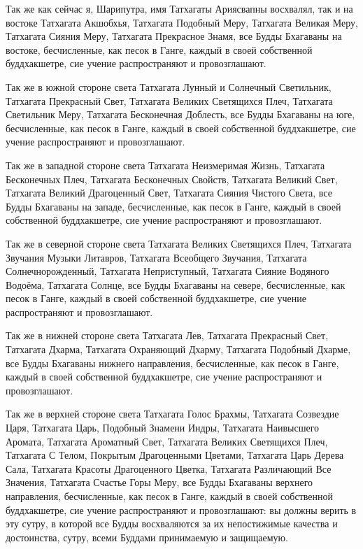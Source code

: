 \documentclass[openany, oneside]{book}
\begin{document}
Так же как сейчас я, Шарипутра, имя Татхагаты Ариясвапны восхвалял, так и на востоке Татхагата Акшобхья, Татхагата Подобный Меру, Татхагата Великая Меру, Татхагата Сияния Меру, Татхагата Прекрасное Знамя, все Будды Бхагаваны на востоке, бесчисленные, как песок в Ганге, каждый в своей собственной буддхакшетре, сие учение распространяют и провозглашают.

Так же в южной стороне света Татхагата Лунный и Солнечный Светильник, Татхагата Прекрасный Свет, Татхагата Великих Светящихся Плеч, Татхагата Светильник Меру, Татхагата Бесконечная Доблесть, все Будды Бхагаваны на юге, бесчисленные, как песок в Ганге, каждый в своей собственной буддхакшетре, сие учение распространяют и провозглашают.

Так же в западной стороне света Татхагата Неизмеримая Жизнь, Татхагата Бесконечных Плеч, Татхагата Бесконечных Свойств, Татхагата Великий Свет, Татхагата Великий Драгоценный Свет, Татхагата Сияния Чистого Света, все Будды Бхагаваны на западе, бесчисленные, как песок в Ганге, каждый в своей собственной буддхакшетре, сие учение распространяют и провозглашают.

Так же в северной стороне света Татхагата Великих Светящихся Плеч, Татхагата Звучания Музыки Литавров, Татхагата Всеобщего Звучания, Татхагата Солнечнорожденный, Татхагата Неприступный, Татхагата Сияние Водяного Водоёма, Татхагата Солнце, все Будды Бхагаваны на севере, бесчисленные, как песок в Ганге, каждый в своей собственной буддхакшетре, сие учение распространяют и провозглашают.

Так же в нижней стороне света Татхагата Лев, Татхагата Прекрасный Свет, Татхагата Дхарма, Татхагата Охраняющий Дхарму, Татхагата Подобный Дхарме, все Будды Бхагаваны нижнего направления, бесчисленные, как песок в Ганге, каждый в своей собственной буддхакшетре, сие учение распространяют и провозглашают.

Так же в верхней стороне света Татхагата Голос Брахмы, Татхагата Созвездие Царя, Татхагата Царь, Подобный Знамени Индры, Татхагата Наивысшего Аромата, Татхагата Ароматный Свет, Татхагата Великих Светящихся Плеч, Татхагата С Телом, Покрытым Драгоценными Цветами, Татхагата Царь Дерева Сала, Татхагата Красоты Драгоценного Цветка, Татхагата Различающий Все Значения, Татхагата Счастье Горы Меру, все Будды Бхагаваны верхнего направления, бесчисленные, как песок в Ганге, каждый в своей собственной буддхакшетре, сие учение распространяют и провозглашают: вы должны верить в эту сутру, в которой все Будды восхваляются за их непостижимые качества и достоинства, сутру, всеми Буддами принимаемую и защищаемую.
\end{document}
